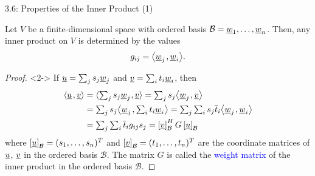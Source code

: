 \documentclass[10pt,english,aspectratio=169]{beamer}
\begin{document}
\begin{frame}{3.6: Properties of the Inner Product (1)}

\vspace{-1.5mm}

\begin{theorem}
Let $V$ be a finite-dimensional space with ordered basis $\mathcal{B} = \underline{w}_1, \ldots, \underline{w}_n$.
Then, any inner product on $V$ is determined by the values \vspace{-1.5mm}
\begin{equation*}
g_{ij} = {\left\langle  \underline{w}_j  \mskip2mu ,  \underline{w}_i  \right\rangle}.
\end{equation*}
\end{theorem}

\begin{proof}<2->
If $\underline{u} = \sum_{j} s_j \underline{w}_j$ and $\underline{v} = \sum_{i} t_i \underline{w}_i$, then \vspace{-1.5mm}
\begin{equation*}
\begin{split}
{\left\langle  \underline{u}  \mskip2mu ,  \underline{v}  \right\rangle}
&= {\langle  \textstyle\sum_{j} s_j \underline{w}_j  \mskip1mu ,  \underline{v}  \rangle}
= \textstyle\sum_{j} s_j {\left\langle  \underline{w}_j  \mskip2mu ,  \underline{v}  \right\rangle} \\
&= \textstyle\sum_{j} s_j {\left\langle  \underline{w}_j  \mskip2mu ,  \textstyle\sum_{i} t_i \underline{w}_i  \right\rangle}
= \textstyle\sum_{j} \textstyle\sum_{i} s_j \overline{t}_i {\left\langle  \underline{w}_j  \mskip2mu ,  \underline{w}_i  \right\rangle} \\
&= \textstyle\sum_{j} \textstyle\sum_{i} \overline{t}_i g_{ij} s_j
= \left[ \underline{v} \right]_{\mathcal{B}}^H G \left[ \underline{u} \right]_{\mathcal{B}}
\end{split}
\end{equation*}
where $\left[ \underline{u} \right]_{\mathcal{B}} = (s_1,\ldots,s_n)^T$ and $\left[ \underline{v} \right]_{\mathcal{B}} = (t_1,\ldots,t_n)^T$ are the coordinate matrices of $\underline{u}$, $\underline{v}$ in the ordered basis $\mathcal{B}$.
The matrix $G$ is called the \textcolor{blue}{weight matrix} of the inner product in the ordered basis $\mathcal{B}$.
\end{proof}

\end{frame}
\end{document}
